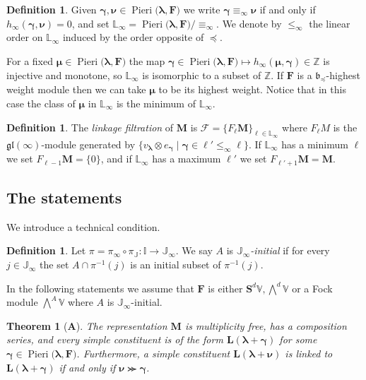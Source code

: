 \documentclass[11pt,fleqn]{amsart}
\newcommand\ZZ{\mathbb Z}
\newcommand\II{\mathbb I}
\newcommand\JJ{\mathbb J}
\newcommand\LL{\mathbb L}
\renewcommand\ll{{\boldsymbol \ell}}
\renewcommand\to{\longrightarrow}
\newtheorem*{thm*}{Theorem}
\theoremstyle{definition}
\newtheorem{defn}[thm]{Definition}
\theoremstyle{remark}
\theoremstyle{remark}
\newcommand\VV{\mathbb V}
\newcommand\gl{\mathfrak{gl}}
\renewcommand\SS{\mathbf S}
\newcommand\lie[1]{\mathfrak{#1}}
\newcommand\wt[1]{\boldsymbol{#1}}
\newcommand\Pieri[2]{\operatorname{Pieri}{(#1},{#2)}}
\begin{document}
\begin{defn}
Given $\wt\gamma,\wt\nu \in \Pieri{\wt\lambda}{\mathbf F}$ we write $\wt\gamma 
\equiv_\infty \wt\nu$ if and only if $h_\infty(\wt\gamma, \wt\nu) = 0$, and set 
$\LL_\infty = \Pieri{\wt\lambda}{\mathbf F}/\equiv_\infty$. We denote by 
$\leq_\infty$ the linear order on $\LL_\infty$ induced by the order opposite of 
$\preceq$.
\end{defn}

For a fixed $\wt\mu \in \Pieri{\wt\lambda}{\mathbf F}$ the map $\wt\gamma \in 
\Pieri{\wt\lambda}{\mathbf F} \mapsto h_\infty(\wt\mu,\wt\gamma) \in \ZZ$ is 
injective and monotone, so $\LL_\infty$ is isomorphic to a subset of $\ZZ$. 
If $\mathbf F$ is a $\lie b_{\preceq}$-highest weight module then we can take
$\wt\mu$ to be its highest weight. Notice that in this case the class of $\wt
\mu$ in $\LL_\infty$ is the minimum of $\LL_\infty$. 

\begin{defn}
The \emph{linkage filtration} of $\mathbf M$ is $\mathcal F = \{F_\ll \mathbf 
M\}_{\ll \in \LL_\infty}$ where $F_\ll M$ is the $\gl(\infty)$-module generated 
by $\{v_{\wt\lambda} \otimes e_{\wt\gamma} \mid \wt\gamma \in \ll' \leq_\infty 
\ll\}$. If $\LL_\infty$ has a minimum $\ell$ we set $F_{\ll-1}\mathbf M = 
\{0\}$, and if $\LL_\infty$ has a maximum $\ll'$ we set $F_{\ll'+1} \mathbf M = 
\mathbf M$.
\end{defn}

\subsection{The statements}
We introduce a technical condition.
\begin{defn}
Let $\pi = \pi_\infty \circ \pi_\JJ: \II \to \JJ_\infty$. We say $A$ is 
\emph{$\JJ_\infty$-initial} if for every $j \in \JJ_\infty$ the set $A \cap 
\pi^{-1}(j)$ is an initial subset of $\pi^{-1}(j)$.
\end{defn}
In the following statements we assume that $\mathbf F$ is either $\SS^d\VV, 
\bigwedge^d \VV$ or a Fock module $\bigwedge^A \VV$ where $A$ is 
$\JJ_\infty$-initial.

\begin{thm*}[\textbf A]
The representation $\mathbf M$ is multiplicity free, has a composition series, 
and every simple constituent is of the form $\mathbf L(\wt\lambda + \wt\gamma)$ 
for some $\wt\gamma \in \Pieri{\wt\lambda}{\mathbf F}$. Furthermore, a simple 
constituent $\mathbf L(\wt\lambda + \wt\nu)$ is linked to $\mathbf L(\wt\lambda 
+ \wt\gamma)$ if and only if $\wt\nu \ggcurly \wt\gamma$.
\end{thm*}
\end{document}
